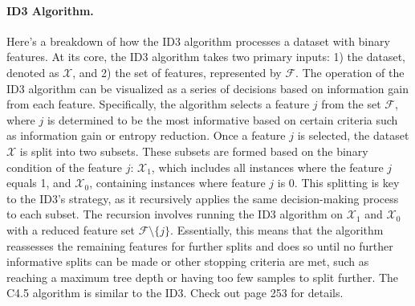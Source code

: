 {    \paragraph{ID3 Algorithm.} 
    Here's a breakdown of how the ID3 algorithm processes a dataset with binary features.
    At its core, the ID3 algorithm takes two primary inputs: 1) the dataset, denoted as $\mathcal{X}$, and 2) the set of features, represented by $\mathcal{F}$.
    The operation of the ID3 algorithm can be visualized as a series of decisions based on information gain from each feature. Specifically, the algorithm selects a feature $j$ from the set $\mathcal{F}$, where $j$ is determined to be the most informative based on certain criteria such as information gain or entropy reduction.
    Once a feature $j$ is selected, the dataset $\mathcal{X}$ is split into two subsets. These subsets are formed based on the binary condition of the feature $j$:
    $\mathcal{X}_1$, which includes all instances where the feature $j$ equals 1, and
    $\mathcal{X}_0$, containing instances where feature $j$ is 0.
    This splitting is key to the ID3's strategy, as it recursively applies the same decision-making process to each subset. The recursion involves running the ID3 algorithm on $\mathcal{X}_1$ and $\mathcal{X}_0$ with a reduced feature set $\mathcal{F} \setminus \{j \}$. Essentially, this means that the algorithm reassesses the remaining features for further splits and does so until no further informative splits can be made or other stopping criteria are met, such as reaching a maximum tree depth or having too few samples to split further.
    The C4.5 algorithm is similar to the ID3. 
    Check out \cite{shalev2014understanding} page 253 for details. 

}
